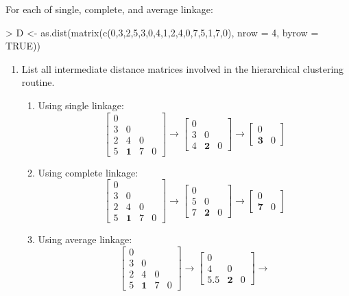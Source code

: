 \documentclass[12pt,a4paper]{paper}
\begin{document}
\begin{enumerate}
For each of single, complete, and average linkage:
\begin{Schunk}
\begin{Sinput}
> D <- as.dist(matrix(c(0,3,2,5,3,0,4,1,2,4,0,7,5,1,7,0), nrow = 4, byrow = TRUE))
\end{Sinput}
\end{Schunk}
\begin{enumerate}
\item List all intermediate distance matrices involved in the hierarchical clustering routine.
\begin{enumerate}
\item Using single linkage:
\[\left[\begin{array}{cccc}0&&&\\3&0&&\\2&4&0&\\5&\textbf{1}&7&0\end{array}\right] \rightarrow
\left[\begin{array}{ccc}0&&\\3&0&\\4&\textbf{2}&0\end{array}\right] \rightarrow
\left[\begin{array}{cc}0&\\\textbf{3}&0\end{array}\right]\]
\item Using complete linkage:
\[\left[\begin{array}{cccc}0&&&\\3&0&&\\2&4&0&\\5&\textbf{1}&7&0\end{array}\right] \rightarrow
\left[\begin{array}{ccc}0&&\\5&0&\\7&\textbf{2}&0\end{array}\right] \rightarrow
\left[\begin{array}{cc}0&\\\textbf{7}&0\end{array}\right]
\]
\item Using average linkage:
\[\left[\begin{array}{cccc}0&&&\\3&0&&\\2&4&0&\\5&\textbf{1}&7&0\end{array}\right] \rightarrow
\left[\begin{array}{ccc}0&&\\4&0&\\5.5&\textbf{2}&0\end{array}\right] \rightarrow
\]
\end{enumerate}
\end{enumerate}
\end{enumerate}
\end{document}
